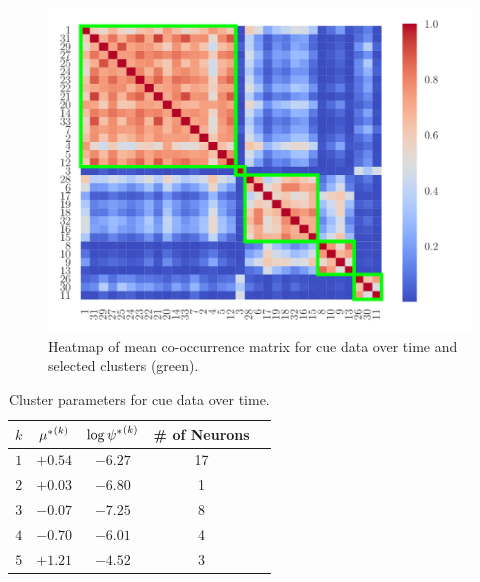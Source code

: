 \documentclass[twoside]{article}
\begin{document}
\begin{figure}[h]
\begin{center}
\includegraphics[scale=0.3]{../img/cue.pdf}
\end{center}
\caption{Heatmap of mean co-occurrence matrix for cue data over time and selected clusters (green).} 
\label{cue-hm}
\end{figure}

\begin{table}[h]
\vspace{-3mm}
\caption{Cluster parameters for cue data over time.} \label{sample-table} \label{cue-table}
\begin{center}
\begin{tabular}{c|cccl}
$k$ & ${\mu^*}^{(k)}_{}$ & $\log {\psi^*}^{(k)}_{}$ &\# of Neurons \\
\hline
$1$ & $+0.54$ & $-6.27$ & 17  \\
$2$ &$+0.03$ & $-6.80$ & 1 \\
$3$ &$-0.07$ & $-7.25$  & 8 \\
$4$ &$-0.70$ & $-6.01$ & 4 \\
$5$ &$+1.21$ & $-4.52$ & 3 
\end{tabular}
\vspace{-4mm}
\end{center}\end{table}   
\end{document}
